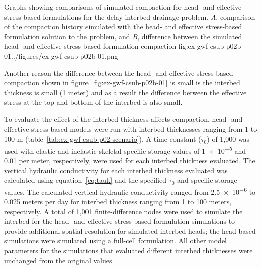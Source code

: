 \begin{StandardFigure}{
                                     Graphs showing comparisons of simulated compaction for head- and 
                                     effective stress-based formulations for the delay interbed drainage 
                                     problem. \textit{A}, comparison of the compaction history simulated 
                                     with the head- and effective stress-based formulation solution to 
                                     the problem, and \textit{B}, difference between the simulated head- 
                                     and effective stress-based formulation compaction
                                     }{fig:ex-gwf-csub-p02b-01}{../figures/ex-gwf-csub-p02b-01.png}
\end{StandardFigure}         

Another reason the difference between the head- and effective stress-based compaction shown in figure~\ref{fig:ex-gwf-csub-p02b-01} is small is the interbed thickness is small (1 meter) and as a result the difference between the effective stress at the top and bottom of the interbed is also small. 

To evaluate the effect of the interbed thickness affects compaction, head- and effective stress-based models were run with interbed thicknesses ranging from 1 to 100 m (table~\ref{tab:ex-gwf-csub-p02-scenario}).  A time constant ($\tau_0$) of 1,000 was used with elastic and inelastic skeletal specific storage values of \num{1e-5} and 0.01 per meter, respectively, were used for each interbed thickness evaluated. The vertical hydraulic conductivity for each interbed thickness evaluated was calculated using equation~\ref{eq:tauk} and the specified $\tau_0$ and specific storage values. The calculated vertical hydraulic conductivity ranged from \num{2.5e-6} to 0.025 meters per day for interbed thickness ranging from 1 to 100 meters, respectively. A total of 1,001 finite-difference nodes were used to simulate the interbed for the head- and effective stress-based formulation simulations to provide additional spatial resolution for simulated interbed heads; the head-based simulations were simulated using a full-cell formulation. All other model parameters for the simulations that evaluated different interbed thicknesses were unchanged from the original values.

